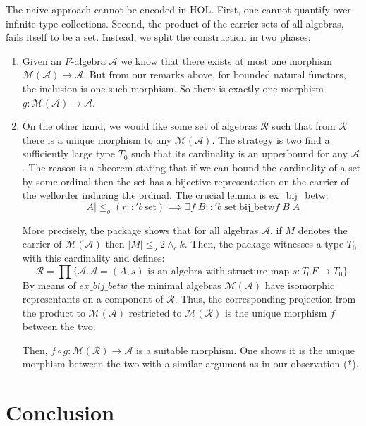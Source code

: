 \documentclass[notitlepage]{article}
\begin{document}
The naive approach cannot be encoded in HOL. First, one cannot quantify over infinite type collections. Second, the product of the carrier sets of all algebras, fails itself to be a set. Instead, we split the construction in two phases:

\begin{enumerate}
	\item Given an $F$-algebra $\mathcal{A}$ we know that there exists at most one morphism $\mathcal{M}(\mathcal{A}) \to \mathcal{A}$. But from our remarks above, for bounded natural functors, the inclusion is one such morphism. So there is exactly one morphism $g: \mathcal{M}(\mathcal{A}) \to \mathcal{A}$.
	\item On the other hand, we would like some set of algebras $\mathcal{R}$ such that from $\mathcal{R}$ there is a unique morphism to any $\mathcal{M}(\mathcal{A})$. The strategy is two find a sufficiently large type $T_0$ such that its cardinality is an upperbound for any $\mathcal{A}$. The reason is a theorem stating that if we can bound the cardinality of a set by some ordinal then the set has a bijective representation on the carrier of the wellorder inducing the ordinal. The crucial lemma is ex\_bij\_betw: \[|A| \le_o (r :: 'b \, \text{set}) \implies \exists f \; B::'b \; \text{set}. \text{bij\_betw} f \; B \; A\]
	
	More precisely, the package shows that for all algebras $\mathcal{A}$, if $M$ denotes the carrier of $\mathcal{M}(\mathcal{A})$ then $|M| \le_o 2  \wedge_c k$. Then, the package witnesses a type $T_0$ with this cardinality and defines: \[\mathcal{R} = \prod \{\mathcal{A}. \mathcal{A} = (A,s) \text{ is an algebra with structure map } s: T_0 F \to T_0 \}\] By means of $ex\_bij\_betw$ the minimal algebras $\mathcal{M}(\mathcal{A})$ have isomorphic representants on a component of $\mathcal{R}$. Thus, the corresponding projection from the product to $\mathcal{M}(\mathcal{A})$ restricted to $\mathcal{M}(\mathcal{R})$ is the unique morphism  $f$ between the two. 
	
	Then, $f \circ g: \mathcal{M}(\mathcal{R}) \to \mathcal{A}$ is a suitable morphism. One shows it is the unique morphism between the two with a similar argument as in our observation (*).
\end{enumerate}

\section{Conclusion}
\end{document}
